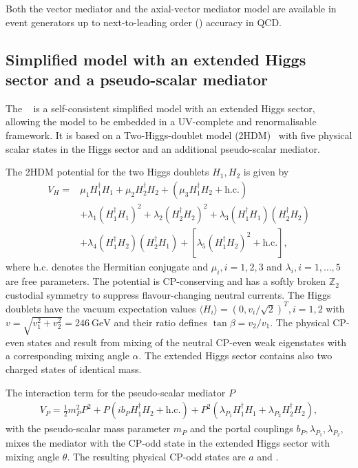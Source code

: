 Both the vector mediator and the axial-vector mediator model are available in event generators up to next-to-leading order (\NLO) accuracy in QCD.

\subsection{Simplified model with an extended Higgs sector and a pseudo-scalar mediator}
\label{sec:dm:models:ahdm}
The \ahdm~\cite{Bauer2017} is a self-consistent simplified model with an extended Higgs sector, allowing the model to be embedded in a UV-complete and renormalisable framework. It is based on a Two-Higgs-doublet model (2HDM)~\cite{Branco2012} with five physical scalar states in the Higgs sector and an additional pseudo-scalar mediator.

The 2HDM potential for the two Higgs doublets \(H_{1}, H_{2}\) is given by
\begin{align}
    V_{H} = &\mu_{1} H_{1}^{\dagger} H_{1} + \mu_{2} H_{2}^{\dagger} H_{2} + (\mu_{3} H_{1}^{\dagger} H_{2} + \text{h.c.}) \nonumber \\
    & + \lambda_{1} (H_{1}^{\dagger} H_{1})^2 + \lambda_{2} (H_{2}^{\dagger} H_{2})^2 + \lambda_{3} (H_{1}^{\dagger} H_{1}) (H_{2}^{\dagger} H_{2}) \nonumber \\
    & + \lambda_{4} (H_{1}^{\dagger} H_{2}) (H_{2}^{\dagger} H_{1}) + \left[\lambda_{5} (H_{1}^{\dagger} H_{2})^2 + \text{h.c.}\right],
\end{align}
where \(\text{h.c.}\) denotes the Hermitian conjugate and \(\mu_{i}, i=1,2,3\) and \(\lambda_{i}, i=1,\dots,5\) are free parameters. The potential is CP-conserving and has a softly broken \(\mathbb{Z}_{2}\) custodial symmetry to suppress flavour-changing neutral currents. The Higgs doublets have the vacuum expectation values \(\langle H_{i} \rangle = (0, v_{i} / \sqrt{2})^{T}, i=1,2\) with \(v = \sqrt{v_{1}^2 + v_{2}^2} = \SI{246}{\giga\electronvolt}\) and their ratio defines \(\tan \beta = v_2 / v_1\). The physical CP-even states \Ph and \PH result from mixing of the  neutral CP-even weak eigenstates with a corresponding mixing angle \(\alpha\). The extended Higgs sector contains also two charged states \PHpm of identical mass.

The interaction term for the pseudo-scalar mediator \(P\)
\begin{align}
    V_{P} = \frac{1}{2} m_{P}^2 P^2 + P(i b_{P} H_{1}^{\dagger} H_{2} + \text{h.c.}) + P^2 (\lambda_{P_{1}} H_{1}^{\dagger} H_{1} + \lambda_{P_{2}} H_{2}^{\dagger} H_{2}),
\end{align}
with the pseudo-scalar mass parameter \(m_{P}\) and the portal couplings \(b_{P}, \lambda_{P_{1}}, \lambda_{P_{2}}\),
mixes the mediator with the CP-odd state in the extended Higgs sector with mixing angle \(\theta\). The resulting physical CP-odd states are \(a\) and \PA.

